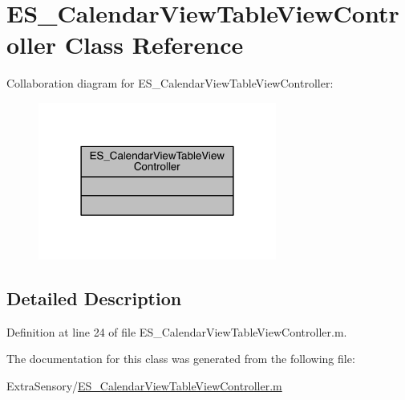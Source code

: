 \hypertarget{class_e_s___calendar_view_table_view_controller}{\section{E\+S\+\_\+\+Calendar\+View\+Table\+View\+Controller Class Reference}
\label{class_e_s___calendar_view_table_view_controller}
}


Collaboration diagram for E\+S\+\_\+\+Calendar\+View\+Table\+View\+Controller\+:\nopagebreak
\begin{figure}[H]
\begin{center}
\leavevmode
\includegraphics[width=222pt]{d3/de0/class_e_s___calendar_view_table_view_controller__coll__graph}
\end{center}
\end{figure}


\subsection{Detailed Description}


Definition at line 24 of file E\+S\+\_\+\+Calendar\+View\+Table\+View\+Controller.\+m.



The documentation for this class was generated from the following file\+:\begin{DoxyCompactItemize}
\item 
Extra\+Sensory/\hyperlink{_e_s___calendar_view_table_view_controller_8m}{E\+S\+\_\+\+Calendar\+View\+Table\+View\+Controller.\+m}\end{DoxyCompactItemize}
